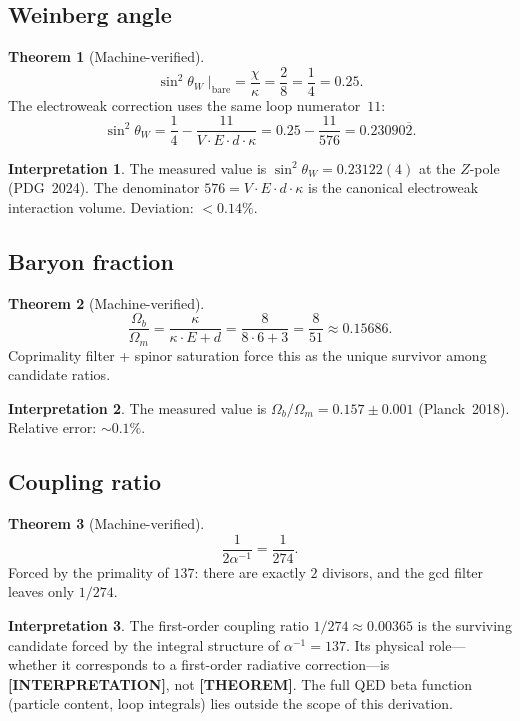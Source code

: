 \documentclass[11pt,a4paper]{article}
\newcommand{\THEOREM}{\textcolor{blue!70!black}{\textbf{[THEOREM]}}}
\newcommand{\INTERP}{\textcolor{orange!80!black}{\textbf{[INTERPRETATION]}}}
\theoremstyle{definition}
\newtheorem{theorem}{Theorem}[section]
\newtheorem*{interpretation}{Interpretation}
\begin{document}
\subsection{Weinberg angle}

\begin{theorem}[Machine-verified]
\[
  \sin^2 \theta_W \;\big|_{\mathrm{bare}} = \frac{\chi}{\kappa} = \frac{2}{8} = \frac{1}{4} = 0.25.
\]
The electroweak correction uses the same loop numerator~$11$:
\[
  \sin^2 \theta_W = \frac{1}{4} - \frac{11}{V \cdot E \cdot d \cdot \kappa}
  = 0.25 - \frac{11}{576} = 0.23090\overline{2}.
\]
\end{theorem}

\begin{interpretation}
The measured value is $\sin^2\theta_W = 0.23122(4)$ at the $Z$-pole
(PDG~2024).  The denominator $576 = V \cdot E \cdot d \cdot \kappa$
is the canonical electroweak interaction volume.
Deviation: $< 0.14\%$.
\end{interpretation}

\subsection{Baryon fraction}

\begin{theorem}[Machine-verified]
\[
  \frac{\Omega_b}{\Omega_m} = \frac{\kappa}{\kappa \cdot E + d}
  = \frac{8}{8 \cdot 6 + 3} = \frac{8}{51} \approx 0.15686.
\]
Coprimality filter + spinor saturation force this as the unique
survivor among candidate ratios.
\end{theorem}

\begin{interpretation}
The measured value is $\Omega_b / \Omega_m = 0.157 \pm 0.001$
(Planck~2018).  Relative error: $\sim 0.1\%$.
\end{interpretation}

\subsection{Coupling ratio}

\begin{theorem}[Machine-verified]
\[
  \frac{1}{2\alpha^{-1}} = \frac{1}{274}.
\]
Forced by the primality of $137$: there are exactly $2$ divisors, and
the gcd filter leaves only $1/274$.
\end{theorem}

\begin{interpretation}
The first-order coupling ratio $1/274 \approx 0.00365$ is the surviving
candidate forced by the integral structure of $\alpha^{-1} = 137$.
Its physical role---whether it corresponds to a first-order radiative
correction---is \INTERP, not \THEOREM.  The full QED beta function
(particle content, loop integrals) lies outside the scope of this
derivation.
\end{interpretation}
\end{document}
